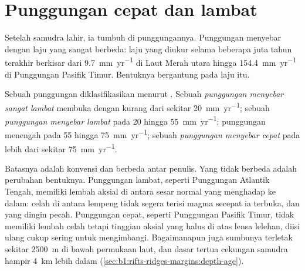 \section{Punggungan cepat dan lambat}

Setelah samudra lahir, ia tumbuh di punggungannya. Punggungan menyebar dengan laju yang sangat berbeda: laju yang diukur selama beberapa juta tahun terakhir berkisar dari \qty{9.7}{mm.yr^{-1}} di Laut Merah utara hingga \qty{154.4}{mm.yr^{-1}} di Punggungan Pasifik Timur. Bentuknya bergantung pada laju itu.

\begin{definition}\label{def:b1:rifts-ridges-margins:ridge-classes}
Sebuah punggungan diklasifikasikan menurut . Sebuah \emph{punggungan menyebar sangat lambat} membuka dengan kurang dari sekitar \qty{20}{mm.yr^{-1}}; sebuah \emph{punggungan menyebar lambat} pada 20 hingga \qty{55}{mm.yr^{-1}}; punggungan menengah pada 55 hingga \qty{75}{mm.yr^{-1}}; sebuah \emph{punggungan menyebar cepat} pada lebih dari sekitar \qty{75}{mm.yr^{-1}}.
\end{definition}

Batasnya adalah konvensi dan berbeda antar penulis. Yang tidak berbeda adalah perubahan bentuknya. Punggungan lambat, seperti Punggungan Atlantik Tengah, memiliki lembah aksial di antara sesar normal yang menghadap ke dalam: celah di antara lempeng tidak segera terisi magma secepat ia terbuka, dan  yang dingin pecah. Punggungan cepat, seperti Punggungan Pasifik Timur, tidak memiliki lembah celah tetapi tinggian aksial yang halus di atas lensa lelehan, diisi ulang cukup sering untuk mengimbangi. Bagaimanapun juga sumbunya terletak sekitar \qty{2500}{m} di bawah permukaan laut, dan dasar tertua cekungan samudra hampir \qty{4}{km} lebih dalam (\cref{sec:b1:rifts-ridges-margins:depth-age}).

